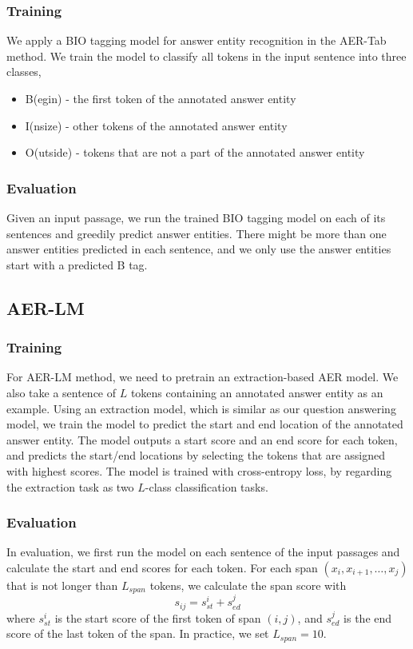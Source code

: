 \documentclass[11pt,a4paper]{article}
\begin{document}
\subsubsection{Training}
We apply a BIO tagging model for answer entity recognition in the AER-Tab method. We train the model to classify all tokens in the input sentence into three classes,
\begin{itemize}
\item B(egin) - the first token of the annotated answer entity
\item I(nsize) - other tokens of the annotated answer entity
\item O(utside) - tokens that are not a part of the annotated answer entity
\end{itemize}

\subsubsection{Evaluation}
Given an input passage, we run the trained BIO tagging model on each of its sentences and greedily predict answer entities. There might be more than one answer entities predicted in each sentence, and we only use the answer entities start with a predicted B tag.

\subsection{AER-LM}

\subsubsection{Training}
For AER-LM method, we need to pretrain an extraction-based AER model. We also take a sentence of $L$ tokens containing an annotated answer entity as an example. Using an extraction model, which is similar as our question answering model, we train the model to predict the start and end location of the annotated answer entity. The model outputs a start score and an end score for each token, and predicts the start/end locations by selecting the tokens that are assigned with highest scores. The model is trained with cross-entropy loss, by regarding the extraction task as two $L$-class classification tasks.

\subsubsection{Evaluation}
In evaluation, we first run the model on each sentence of the input passages and calculate the start and end scores for each token. For each span $(x_i, x_{i+1}, \dots, x_j)$ that is not longer than $L_{span}$ tokens, we calculate the span score with
\begin{equation}
s_{ij} = s_{st}^i + s_{ed}^j
\end{equation}
where $s_{st}^i$ is the start score of the first token of span $(i, j)$, and $s_{ed}^j$ is the end score of the last token of the span. In practice, we set $L_{span} = 10$.
\end{document}
